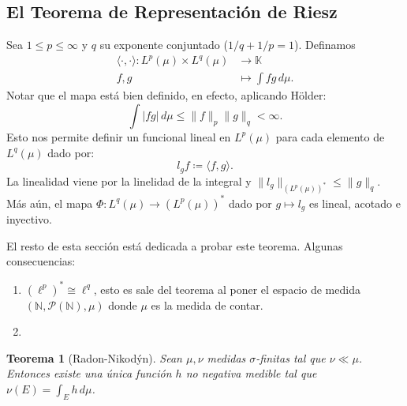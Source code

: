 \documentclass{article}
\newtheorem{Teorema}{Teorema}
\theoremstyle{plain}
\theoremstyle{definition}
\newcommand{\1}[1]{\mathbbm{1}\left( #1 \right)}
\newcommand{\N}{\mathbb{N}}
\newcommand{\K}{\mathbb{K}}
\newcommand{\abs}[1]{\lvert #1 \rvert}
\newcommand{\norm}[1]{\lVert #1 \rVert}
\begin{document}
\subsection*{El Teorema de Representación de Riesz}

Sea \(1\le p \le \infty\) y \(q\) su exponente conjuntado (\(1/q+1/p = 1\)). Definamos
\begin{equation}
\begin{aligned}
  \langle \cdot,\cdot \rangle\colon L^p(\mu)\times L^q(\mu) &\to \K\\
  f,g &\mapsto \int fg\, d\mu.
\end{aligned}
\end{equation}
Notar que el mapa está bien definido, en efecto, aplicando Hölder:
\begin{displaymath}
  \int \abs{fg} \, d\mu \le \norm{f}_p \norm{g}_q < \infty.
\end{displaymath}
Esto nos permite definir un funcional lineal en \(L^p(\mu)\) para cada elemento de 
\(L^q(\mu)\) dado por:
\begin{displaymath}
  l_{g}f \coloneqq \langle f,g \rangle.
\end{displaymath}
La linealidad viene por la linelidad de la integral y \(\norm{l_g}_{(L^p(\mu))^{\ast}} \le \norm{g}_{q}\). 
Más aún, el mapa \(\Phi\colon L^q(\mu) \to (L^p(\mu))^{\ast}\) dado por \(g\mapsto l_g\) es lineal,
acotado e inyectivo.

\begin{center}
\end{center}

El resto de esta sección está dedicada a probar este teorema. Algunas consecuencias:
\begin{enumerate}
  \item \((\ell^p)^{\ast} \cong \ell^q\), esto es sale del teorema al poner el espacio de medida
  \((\N,\mathcal{P}(\N),\mu)\) donde \(\mu\) es la medida de contar. 
  \item 
\end{enumerate}

\begin{Teorema}[Radon-Nikodýn]
  Sean \(\mu,\nu\) medidas \(\sigma\)-finitas tal que \(\nu \ll \mu\). Entonces existe una única
  función \(h\) no negativa medible tal que \(\nu(E) = \int_{E} h\, d\mu\).  
\end{Teorema}
\end{document}
